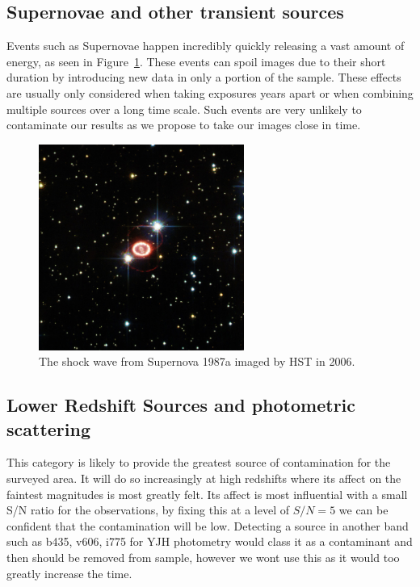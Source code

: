     \subsection{Supernovae and other transient sources} %
    \label{sub:supernovae_and_other_transient_sources}
        Events such as Supernovae happen incredibly quickly releasing a vast amount of energy, as seen in Figure~\ref{fig:SNe_1987a}. These events can spoil images due to their short duration by introducing new data in only a portion of the sample. These effects are usually only considered when taking exposures years apart or when combining multiple sources over a long time scale. Such events are very unlikely to contaminate our results as we propose to take our images close in time.
        \begin{figure}[!htbp]
            \centering
            \includegraphics[width=0.6\textwidth]{../Images/SNe_1987a.jpg}
            \caption{The shock wave from Supernova 1987a imaged by HST in 2006.\label{fig:SNe_1987a}}
        \end{figure}

    \subsection{Lower Redshift Sources and photometric scattering} %
    \label{sub:lower_redshift_sources_and_photometric_scattering}
        This category is likely to provide the greatest source of contamination for the surveyed area. It will do so increasingly at high redshifts where its affect on the faintest magnitudes is most greatly felt. Its affect is most influential with a small S/N ratio for the observations, by fixing this at a level of $S/N = 5$ we can be confident that the contamination will be low. Detecting a source in another band such as b435, v606, i775 for YJH photometry would class it as a contaminant and then should be removed from sample, however we wont use this as it would too greatly increase the time.

